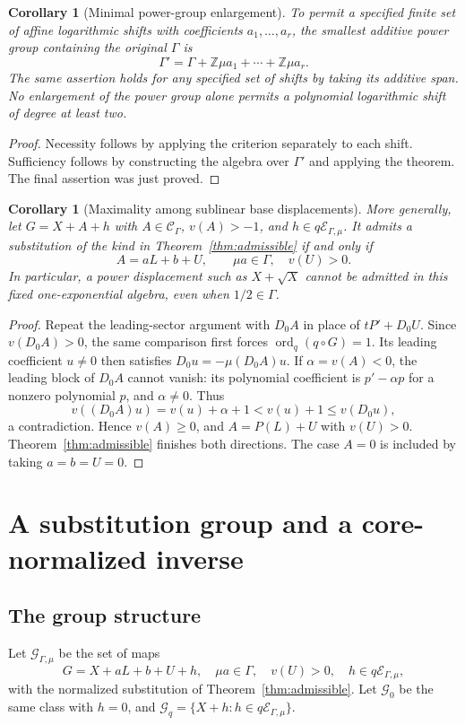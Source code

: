 \documentclass[11pt,a4paper]{article}
\newtheorem{corollary}[theorem]{Corollary}
\theoremstyle{definition}
\theoremstyle{remark}
\newcommand{\Z}{\mathbb Z}
\newcommand{\C}{\mathcal C_\Gamma}
\newcommand{\E}{\mathcal E_{\Gamma,\mu}}
\newcommand{\ordq}{\operatorname{ord}_q}
\begin{document}
\begin{corollary}[Minimal power-group enlargement]\label{cor:enlargement}
To permit a specified finite set of affine logarithmic shifts with
coefficients $a_1,\ldots,a_r$, the smallest additive power group containing
the original $\Gamma$ is
\[
 \Gamma'=\Gamma+\Z\mu a_1+\cdots+\Z\mu a_r.
\]
The same assertion holds for any specified set of shifts by taking its
additive span. No enlargement of the power group alone permits a polynomial
logarithmic shift of degree at least two.
\end{corollary}
\begin{proof}
Necessity follows by applying the criterion separately to each shift.
Sufficiency follows by constructing the algebra over $\Gamma'$ and applying
the theorem. The final assertion was just proved.
\end{proof}

\begin{corollary}[Maximality among sublinear base displacements]
\label{cor:maximal}
More generally, let $G=X+A+h$ with $A\in\C$, $v(A)>-1$, and $h\in q\E$.
It admits a substitution of the kind in Theorem~\ref{thm:admissible} if and
only if
\[
 A=aL+b+U,\qquad \mu a\in\Gamma,\quad v(U)>0.
\]
In particular, a power displacement such as $X+\sqrt X$ cannot be admitted
in this fixed one-exponential algebra, even when $1/2\in\Gamma$.
\end{corollary}
\begin{proof}
Repeat the leading-sector argument with $D_0A$ in place of
$tP'+D_0U$. Since $v(D_0A)>0$, the same comparison first forces
$\ordq(q\circ G)=1$. Its leading coefficient $u\ne0$ then satisfies
$D_0u=-\mu(D_0A)u$. If $\alpha=v(A)<0$, the leading block of $D_0A$
cannot vanish: its polynomial coefficient is $p'-\alpha p$ for a nonzero
polynomial $p$, and $\alpha\ne0$. Thus
\[
 v((D_0A)u)=v(u)+\alpha+1<v(u)+1\le v(D_0u),
\]
a contradiction. Hence $v(A)\ge0$, and $A=P(L)+U$ with $v(U)>0$.
Theorem~\ref{thm:admissible} finishes both directions. The case $A=0$
is included by taking $a=b=U=0$.
\end{proof}

\section{A substitution group and a core-normalized inverse}
\label{sec:core}

\subsection{The group structure}
Let $\mathcal G_{\Gamma,\mu}$ be the set of maps
\begin{equation}\label{eq:admissiblegroup}
 G=X+aL+b+U+h,\quad
 \mu a\in\Gamma,\quad v(U)>0,\quad h\in q\E,
\end{equation}
with the normalized substitution of Theorem~\ref{thm:admissible}.
Let $\mathcal G_0$ be the same class with $h=0$, and
$\mathcal G_q=\{X+h:h\in q\E\}$.
\end{document}
